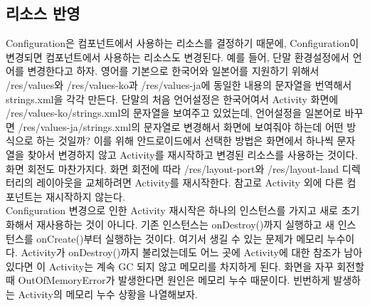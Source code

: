 \subsection{리소스 반영}
Configuration은 컴포넌트에서 사용하는 리소스를 결정하기 때문에,  Configuration이 변경되면 컴포넌트에서 사용하는 리소스도 변경된다. 예를 들어, 단말 환경설정에서 언어를 변경한다고 하자. 영어를 기본으로 한국어와 일본어를 지원하기 위해서 /res/values와 /res/values-ko과 /res/values-ja에 동일한 내용의 문자열을 번역해서 strings.xml을 각각 만든다. 단말의 처음 언어설정은 한국어여서 Activity 화면에 /res/values-ko/strings.xml의 문자열을 보여주고 있었는데, 언어설정을 일본어로 바꾸면 /res/values-ja/strings.xml의 문자열로 변경해서 화면에 보여줘야 하는데 어떤 방식으로 하는 것일까?
이를 위해 안드로이드에서 선택한 방법은 화면에서 하나씩 문자열을 찾아서 변경하지 않고 Activity를 재시작하고 변경된 리소스를 사용하는 것이다.
화면 회전도 마찬가지다. 화면 회전에 따라 /res/layout-port와 /res/layout-land 디렉터리의 레이아웃을 교체하려면 Activity를 재시작한다. 참고로 Activity 외에 다른 컴포넌트는 재시작하지 않는다.\\

Configuration 변경으로 인한 Activity 재시작은 하나의 인스턴스를 가지고 새로 초기화해서 재사용하는 것이 아니다. 기존 인스턴스는 onDestroy()까지 실행하고 새 인스턴스를 onCreate()부터 실행하는 것이다. 여기서 생길 수 있는 문제가 메모리 누수이다. Activity가 onDestroy()까지 불리었는데도 어느 곳에 Activity에 대한 참조가 남아있다면 이 Activity는 계속 GC 되지 않고 메모리를 차지하게 된다. 화면을 자꾸 회전할 때 OutOfMemoryError가 발생한다면 원인은 메모리 누수 때문이다. 빈번하게 발생하는 Activity의 메모리 누수 상황을 나열해보자.

